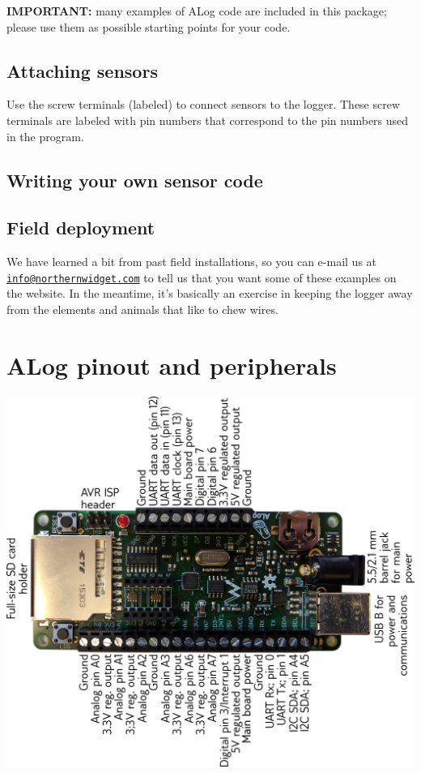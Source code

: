 {\bfseries I\+M\+P\+O\+R\+T\+A\+NT\+:} many examples of A\+Log code are included in this package; please use them as possible starting points for your code.\hypertarget{index_attaching_sensors}{}\subsection{Attaching sensors}\label{index_attaching_sensors}
Use the screw terminals (labeled) to connect sensors to the logger. These screw terminals are labeled with pin numbers that correspond to the pin numbers used in the program.\hypertarget{index_self_made_sensor_code}{}\subsection{Writing your own sensor code}\label{index_self_made_sensor_code}
\hypertarget{index_field_deployment}{}\subsection{Field deployment}\label{index_field_deployment}
We have learned a bit from past field installations, so you can e-\/mail us at \href{mailto:info@northernwidget.com}{\tt info@northernwidget.\+com} to tell us that you want some of these examples on the website. In the meantime, it’s basically an exercise in keeping the logger away from the elements and animals that like to chew wires.\hypertarget{index_pinout}{}\section{A\+Log pinout and peripherals}\label{index_pinout}
 
\begin{DoxyImage}
\includegraphics[width=\linewidth]{LoggerPinout.png}
\caption{A\+Log pinout and peripherals.}
\end{DoxyImage}


